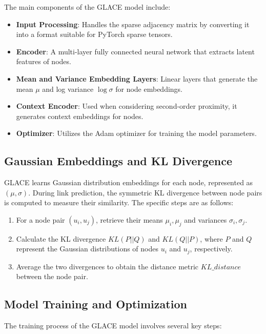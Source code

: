\documentclass[11pt]{article}
\begin{document}
The main components of the GLACE model include:

\begin{itemize}
    \item \textbf{Input Processing}: Handles the sparse adjacency matrix by converting it into a format suitable for PyTorch sparse tensors.
    \item \textbf{Encoder}: A multi-layer fully connected neural network that extracts latent features of nodes.
    \item \textbf{Mean and Variance Embedding Layers}: Linear layers that generate the mean $\mu$ and log variance $\log\sigma$ for node embeddings.
    \item \textbf{Context Encoder}: Used when considering second-order proximity, it generates context embeddings for nodes.
    \item \textbf{Optimizer}: Utilizes the Adam optimizer for training the model parameters.
\end{itemize}

\subsection{Gaussian Embeddings and KL Divergence}

GLACE learns Gaussian distribution embeddings for each node, represented as $(\mu, \sigma)$. During link prediction, the symmetric KL divergence between node pairs is computed to measure their similarity. The specific steps are as follows:

\begin{enumerate}
    \item For a node pair $(u_i, u_j)$, retrieve their means $\mu_i, \mu_j$ and variances $\sigma_i, \sigma_j$.
    \item Calculate the KL divergence $KL(P||Q)$ and $KL(Q||P)$, where $P$ and $Q$ represent the Gaussian distributions of nodes $u_i$ and $u_j$, respectively.
    \item Average the two divergences to obtain the distance metric $KL\_distance$ between the node pair.
\end{enumerate}

\subsection{Model Training and Optimization}

The training process of the GLACE model involves several key steps:
\end{document}
